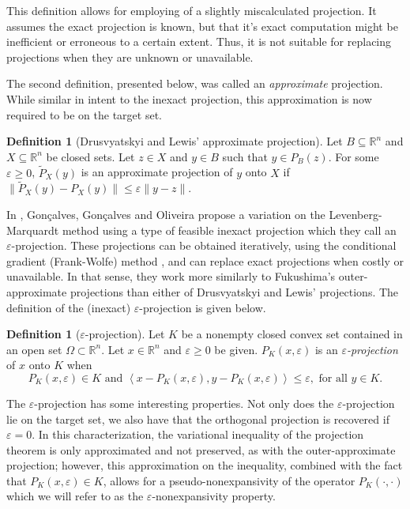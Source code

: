 \documentclass[smallextended,numbook,nospthms]{svjour3}
\theoremstyle{plain}
\theoremstyle{definition}
\newtheorem{definition}[theorem]{Definition}
\def\RR{\mathds R}
\newcommand{\scal}[2]{\left\langle{#1},{#2}  \right\rangle}
\begin{document}
This definition allows for employing of a slightly miscalculated projection. It assumes the exact projection is known, but that it's exact computation might be inefficient or erroneous to a certain extent. Thus, it is not suitable for replacing projections when they are unknown or unavailable.

The second definition, presented below, was called an \emph{approximate} projection. While similar in intent to the inexact projection, this approximation is now required to be on the target set.

\begin{definition}[Drusvyatskyi and Lewis' approximate projection]
	Let $B \subseteq \RR^{n}$ and $X \subseteq \RR^{n}$ be closed sets. Let $z \in X$ and $y \in B$ such that $y \in P_{B}(z)$. For some $\varepsilon \geq 0$, $\tilde{P}_{X}(y)$ is an approximate projection of $y$ onto $X$ if  $\|\tilde{P}_{X}(y)-P_{X}(y)\| \leq \varepsilon \|y - z\|$.
\end{definition}

In \cite{Goncalves:2019}, Gonçalves, Gonçalves and Oliveira propose a variation on the Levenberg-Marquardt method using a type of feasible inexact projection which they call an $\varepsilon$-projection. These projections can be obtained iteratively, using the conditional gradient (Frank-Wolfe) method \cite{Frank:1956, Jaggi:2013}, and can replace exact projections when costly or unavailable. In that sense, they work more similarly to Fukushima's outer-approximate projections than either of Drusvyatskyi and Lewis' projections. The definition of the (inexact) $\varepsilon$-projection is given below.

\begin{definition}[$\varepsilon$-projection]\label{def:epsilon-projection}
	Let $K$ be a nonempty closed convex set contained in an open set $\Omega \subset \RR^n$. Let $x \in \RR^{n}$ and $\varepsilon \geq 0$ be given. $P_{K}(x, \varepsilon)$ is an \emph{$\varepsilon$-projection} of $x$ onto $K$ when
	\[
	P_{K}(x, \varepsilon) \in K \text{ and } \scal{x-P_{K}(x, \varepsilon)}{y-P_{K}(x, \varepsilon)} \leq \varepsilon, \text{ for all } y \in K.
	\]
\end{definition}
The $\varepsilon$-projection has some interesting properties. Not only does the $\varepsilon$-projection lie on the target set, we also have that the orthogonal projection is recovered if $\varepsilon=0$. In this characterization, the variational inequality of the projection theorem is only approximated and not preserved, as with the outer-approximate projection; however, this approximation on the inequality, combined with the fact that $P_{K}(x, \varepsilon) \in K$, allows for a pseudo-nonexpansivity of the operator $P_{K}(\cdot,\cdot)$ which we will refer to as the $\varepsilon$-nonexpansivity property.
\end{document}
